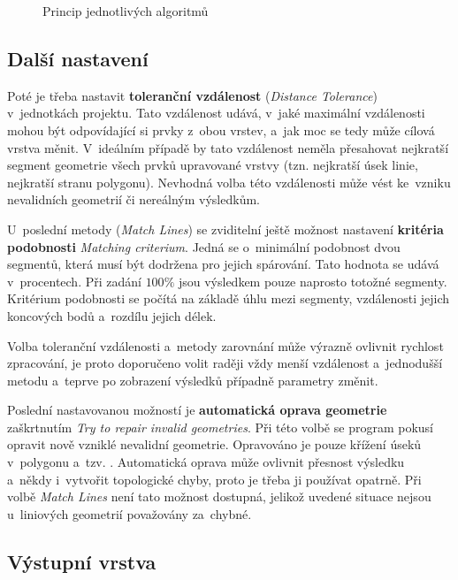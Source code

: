   \begin{figure}[H]
    \centering
      \def\svgwidth{400pt}
      
      \caption{Princip jednotlivých algoritmů}
      \label{fig:algorithms}
  \end{figure}

\subsection{Další nastavení}
Poté je třeba nastavit \textbf{toleranční vzdálenost} (\textit{Distance 
Tolerance}) v~jednotkách projektu. Tato vzdálenost udává, v~jaké maximální 
vzdálenosti mohou být odpovídající si prvky z~obou vrstev, a~jak moc se 
tedy může cílová vrstva měnit. V~ideálním případě by tato vzdálenost 
neměla přesahovat nejkratší segment geometrie všech prvků upravované vrstvy 
(tzn. nejkratší úsek linie, nejkratší stranu polygonu). Nevhodná volba této 
vzdálenosti může vést ke~vzniku nevalidních geometrií či nereálným výsledkům.

U~poslední metody (\textit{Match Lines}) se zviditelní ještě možnost nastavení
\textbf{kritéria podobnosti} \textit{Matching criterium}. Jedná se o~minimální 
podobnost dvou segmentů, která musí být dodržena pro jejich spárování. 
Tato hodnota se udává v~procentech. Při zadání $100 \%$ jsou výsledkem pouze 
naprosto totožné segmenty. Kritérium podobnosti se počítá na základě úhlu mezi 
segmenty, vzdálenosti jejich koncových bodů a~rozdílu jejich délek. 

Volba toleranční vzdálenosti a~metody zarovnání může výrazně ovlivnit rychlost 
zpracování, je proto doporučeno volit raději vždy menší vzdálenost a~jednodušší
metodu a~teprve po zobrazení výsledků případně parametry změnit.

Poslední nastavovanou možností je \textbf{automatická oprava geometrie}
 zaškrtnutím \textit{Try to repair invalid geometries}. Při této volbě se 
program pokusí opravit nově vzniklé nevalidní geometrie. Opravováno je pouze 
křížení úseků v~polygonu a~tzv. . Automatická oprava  
může ovlivnit přesnost výsledku a~někdy i~vytvořit topologické chyby, proto 
je třeba ji používat opatrně. Při volbě \textit{Match Lines} není tato možnost
dostupná, jelikož uvedené situace nejsou u~liniových geometrií považovány
za~chybné.

\subsection{Výstupní vrstva}


